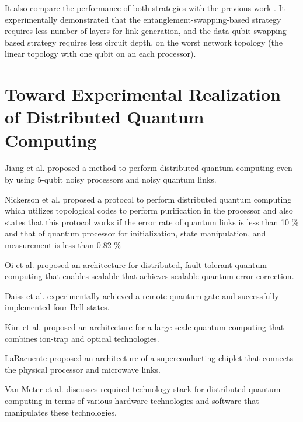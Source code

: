   It also compare the performance of both strategies with the previous work \cite{hypergraph}.  It experimentally demonstrated that the entanglement-swapping-based strategy requires less number of layers for link generation, and the data-qubit-swapping-based strategy requires less circuit depth, on the worst network topology (the linear topology with one qubit on an each processor).

\newpage

\section{Toward Experimental Realization of Distributed Quantum Computing} 

Jiang et al. \cite{jiang} proposed a method to perform distributed quantum computing even by using 5-qubit noisy processors and noisy quantum links. 

Nickerson et al. \cite{nickerson} proposed a protocol to perform distributed quantum computing which utilizes topological codes to perform purification in the processor and also states that this protocol works if the error rate of quantum links is less than 10 \% and that of quantum processor for initialization, state manipulation, and measurement is less than 0.82 \%

Oi et al. \cite{oi} proposed an architecture for distributed, fault-tolerant quantum computing that enables scalable that achieves scalable quantum error correction.

Daiss et al. \cite{daiss} experimentally achieved a remote quantum gate and successfully implemented four Bell states.

Kim et al. \cite{kim} proposed an architecture for a large-scale quantum computing that combines ion-trap and optical technologies.

LaRacuente \cite{laracuente} proposed an architecture of a superconducting chiplet that connects the physical processor and microwave links.

Van Meter et al. \cite{van} discusses required technology stack for distributed quantum computing in terms of various hardware technologies and software that manipulates these technologies.





